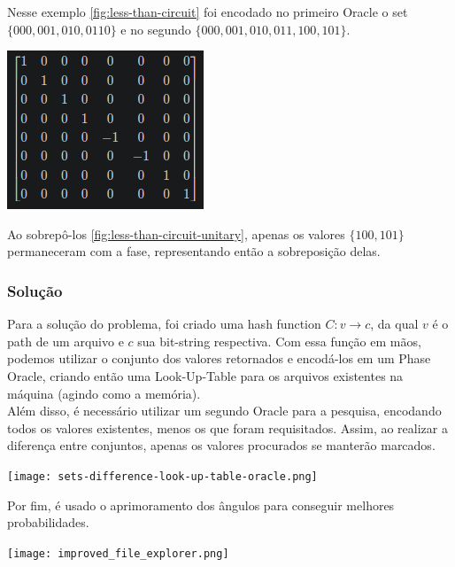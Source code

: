 \documentclass{article}
\begin{document}
Nesse exemplo \ref{fig:less-than-circuit} foi encodado no primeiro Oracle o set $\{000, 001, 010, 0110\}$ e no segundo $\{000, 001, 010, 011, 100, 101\}$.

\begin{center}
	\includegraphics[scale=0.5]{less_than_unitary.png}
	\label{fig:less-than-circuit-unitary}
\end{center}

Ao sobrepô-los \ref{fig:less-than-circuit-unitary}, apenas os valores $\{100, 101\}$ permaneceram com a fase, representando então a sobreposição delas.


\subsubsection{Solução}

Para a solução do problema, foi criado uma hash function $C: v \to c$, da qual $v$ é o path de um arquivo e $c$ sua bit-string respectiva. Com essa função em mãos, podemos utilizar o conjunto dos valores retornados e encodá-los em um Phase Oracle, criando então uma Look-Up-Table para os arquivos existentes na máquina (agindo como a memória).\\
Além disso, é necessário utilizar um segundo Oracle para a pesquisa, encodando todos os valores existentes, menos os que foram requisitados. Assim, ao realizar a diferença entre conjuntos, apenas os valores procurados se manterão marcados.

\begin{center}
	\texttt{[image: sets-difference-look-up-table-oracle.png]}
	\label{fig:luts}
\end{center}


Por fim, é usado o aprimoramento dos ângulos para conseguir melhores probabilidades.

\begin{center}
	\texttt{[image: improved\_file\_explorer.png]}
	\label{fig:file-explorer}
\end{center}
\end{document}
